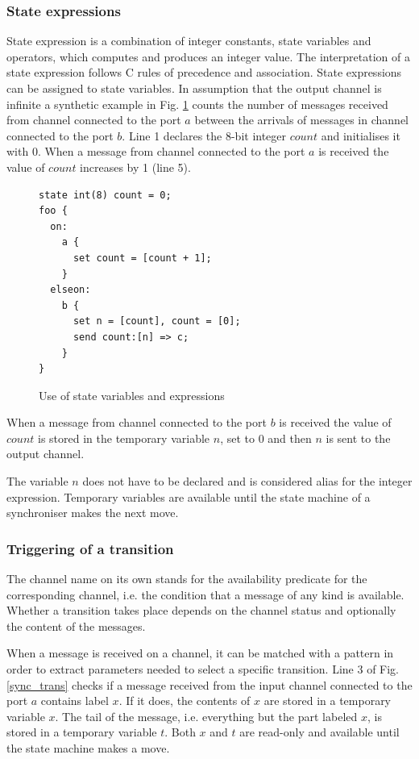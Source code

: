   \subsubsection{State expressions}
State expression is a combination of integer constants, state variables and operators, which computes and produces an integer value. The interpretation of a state expression follows C rules of precedence and association. State expressions can be assigned to state variables. In assumption that the output channel is infinite a synthetic example in Fig. \ref{sync_state_exp} counts the number of messages received from channel connected to the port $a$ between the arrivals of messages in channel connected to the port $b$. Line 1 declares the 8-bit integer $count$ and initialises it with 0. When a message from channel connected to the port $a$ is received the value of $count$ increases by 1 (line 5).

\begin{figure}[h!]
\lstset{numbers=left, numberstyle=\small, stepnumber=1, numbersep=8pt}
\begin{lstlisting}[frame=single]
state int(8) count = 0;
foo {
  on:
    a {
      set count = [count + 1];
    }
  elseon:
    b {
      set n = [count], count = [0];
      send count:[n] => c;
    }
}
\end{lstlisting}
\caption{Use of state variables and expressions}
\label{sync_state_exp}
\end{figure}

When a message from channel connected to the port $b$ is received the value of $count$ is stored in the temporary variable $n$, set to 0 and then $n$ is sent to the output channel.

The variable $n$ does not have to be declared and is considered alias for the integer expression. Temporary variables are available until the state machine of a synchroniser makes the next move.


  \subsubsection{Triggering of a transition}
The channel name on its own stands for the availability predicate for the corresponding channel, i.e. the condition that a message of any kind is available. Whether a transition takes place depends on the channel status and optionally the content of the messages.

When a message is received on a channel, it can be matched with a pattern in order to extract parameters needed to select a specific transition. Line 3 of Fig. \ref{sync_trans} checks if a message received from the input channel connected to the port $a$ contains label $x$. If it does, the contents of $x$ are stored in a temporary variable $x$. The tail of the message, i.e. everything but the part labeled $x$, is stored in a temporary variable $t$. Both $x$ and $t$ are read-only and available until the state machine makes a move.


